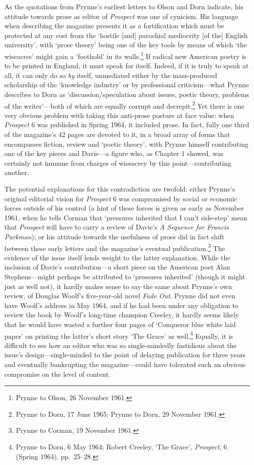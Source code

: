 \documentclass[]{article}
\begin{document}
As the quotations from Prynne's earliest letters to Olson and Dorn
indicate, his attitude towards prose as editor of \emph{Prospect} was
one of cynicism. His language when describing the magazine presents it
as a fortification which must be protected at any cost from the `hostile
{[}and{]} parochial mediocrity {[}of the{]} English university', with
`prose theory' being one of the key tools by means of which `the
wiseacres' might gain a `foothold' in its walls.\footnote{Prynne to
  Olson, 26 November 1961.} If radical new American poetry is to be
printed in England, it must speak for itself. Indeed, if it is truly to
speak at all, it can only do so \emph{by} itself, unmediated either by
the mass-produced scholarship of the `knowledge industry' or by
professional criticism---what Prynne describes to Dorn as
`discussion/speculation about issues, poetic theory, problems of the
writer'---both of which are equally corrupt and decrepit.\footnote{Prynne
  to Dorn, 17 June 1965; Prynne to Dorn, 29 November 1961.} Yet there is
one very obvious problem with taking this anti-prose posture at face
value: when \emph{Prospect} 6 was published in Spring 1964, it included
prose. In fact, fully one third of the magazine's 42 pages are devoted
to it, in a broad array of forms that encompasses fiction, review and
`poetic theory', with Prynne himself contributing one of the key pieces
and Davie---a figure who, as Chapter 1 showed, was certainly not immune
from charges of wiseacrey by this point---contributing another.

The potential explanations for this contradiction are twofold: either
Prynne's original editorial vision for \emph{Prospect} 6 was compromised
by social or economic forces outside of his control (a hint of these
forces is given as early as November 1961, when he tells Corman that
`pressures inherited that I can't side-step' mean that \emph{Prospect}
will have to carry a review of Davie's \emph{A Sequence for Francis
Parkman}); or his attitude towards the usefulness of prose did in fact
shift between these early letters and the magazine's eventual
publication.\footnote{Prynne to Corman, 19 November 1961.} The evidence
of the issue itself lends weight to the latter explanation. While the
inclusion of Davie's contribution---a short piece on the American poet
Alan Stephens---might perhaps be attributed to `pressures inherited'
(though it might just as well not), it hardly makes sense to say the
same about Prynne's own review, of Douglas Woolf's five-year-old novel
\emph{Fade Out}. Prynne did not even have Woolf's address in May 1964,
and if he had been under any obligation to review the book by Woolf's
long-time champion Creeley, it hardly seems likely that he would have
wasted a further four pages of `Conqueror blue white laid paper' on
printing the latter's short story `The Grace' as well.\footnote{Prynne
  to Dorn, 6 May 1964; Robert Creeley, `The Grace', \emph{Prospect}, 6
  (Spring 1964), pp.~25--28.} Equally, it is difficult to see how an
editor who was so single-mindedly fastidious about the issue's
design---single-minded to the point of delaying publication for three
years and eventually bankrupting the magazine---could have tolerated
such an obvious compromise on the level of content.
\end{document}
